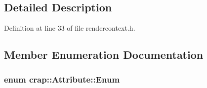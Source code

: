 \subsection{Detailed Description}


Definition at line 33 of file rendercontext.\+h.



\subsection{Member Enumeration Documentation}
\hypertarget{structcrap_1_1_attribute_a744a08bda8d2274974104f1edf5e2d0d}{}
\subsubsection[{Enum}]{\setlength{\rightskip}{0pt plus 5cm}enum {\bf crap\+::\+Attribute\+::\+Enum}}\label{structcrap_1_1_attribute_a744a08bda8d2274974104f1edf5e2d0d}

